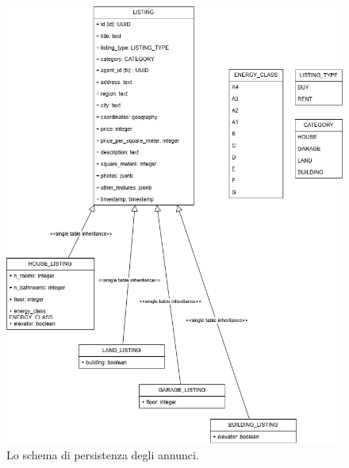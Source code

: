 \begin{figure}[h]
    \centering
    \includegraphics[width=\textwidth]{assets/diagrams/db-scheme/listing.png}
    \caption{Lo schema di persistenza degli annunci.}
    \label{fig:Schema di persistenza degli annunci}
\end{figure}

